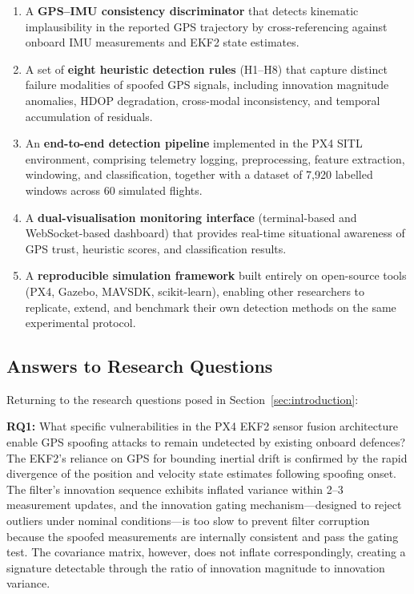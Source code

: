 \documentclass[electronics,article,accept,moreauthors]{Definitions/mdpi}
\begin{document}
\begin{enumerate}
    \item A \textbf{GPS--IMU consistency discriminator} that detects kinematic implausibility in the reported GPS trajectory by cross-referencing against onboard IMU measurements and EKF2 state estimates.
    \item A set of \textbf{eight heuristic detection rules} (H1--H8) that capture distinct failure modalities of spoofed GPS signals, including innovation magnitude anomalies, HDOP degradation, cross-modal inconsistency, and temporal accumulation of residuals.
    \item An \textbf{end-to-end detection pipeline} implemented in the PX4 SITL environment, comprising telemetry logging, preprocessing, feature extraction, windowing, and classification, together with a dataset of 7,920 labelled windows across 60 simulated flights.
    \item A \textbf{dual-visualisation monitoring interface} (terminal-based and WebSocket-based dashboard) that provides real-time situational awareness of GPS trust, heuristic scores, and classification results.
    \item A \textbf{reproducible simulation framework} built entirely on open-source tools (PX4, Gazebo, MAVSDK, scikit-learn), enabling other researchers to replicate, extend, and benchmark their own detection methods on the same experimental protocol.
\end{enumerate}

\subsection{Answers to Research Questions}

Returning to the research questions posed in Section~\ref{sec:introduction}:

\textbf{RQ1:} What specific vulnerabilities in the PX4 EKF2 sensor fusion architecture enable GPS spoofing attacks to remain undetected by existing onboard defences? The EKF2's reliance on GPS for bounding inertial drift is confirmed by the rapid divergence of the position and velocity state estimates following spoofing onset. The filter's innovation sequence exhibits inflated variance within 2--3 measurement updates, and the innovation gating mechanism---designed to reject outliers under nominal conditions---is too slow to prevent filter corruption because the spoofed measurements are internally consistent and pass the gating test. The covariance matrix, however, does not inflate correspondingly, creating a signature detectable through the ratio of innovation magnitude to innovation variance.
\end{document}
